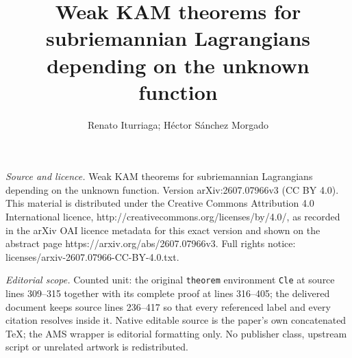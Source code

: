 \documentclass[10pt,a4paper]{amsart}
\begin{document}
\title[Weak KAM theorems for subriemannian Lagrangians depending on]{Weak KAM theorems for subriemannian Lagrangians depending on the unknown function}
\author{Renato Iturriaga; Héctor Sánchez Morgado}
\date{}
\maketitle
\noindent\emph{Source and licence.} Weak KAM theorems for subriemannian Lagrangians depending on the unknown function. Version arXiv:2607.07966v3 (CC BY 4.0). This material is distributed under the Creative Commons Attribution 4.0 International licence, http://creativecommons.org/licenses/by/4.0/, as recorded in the arXiv OAI licence metadata for this exact version and shown on the abstract page https://arxiv.org/abs/2607.07966v3. Full rights notice: licenses/arxiv-2607.07966-CC-BY-4.0.txt.\par\smallskip
\noindent\textit{Editorial scope.} Counted unit: the original \texttt{theorem} environment \texttt{Cle} at source lines 309--315 together with its complete proof at lines 316--405; the delivered document keeps source lines 236--417 so that every referenced label and every citation resolves inside it. Native editable source is the paper's own concatenated TeX; the AMS wrapper is editorial formatting only. No publisher class, upstream script or unrelated artwork is redistributed.
\end{document}
